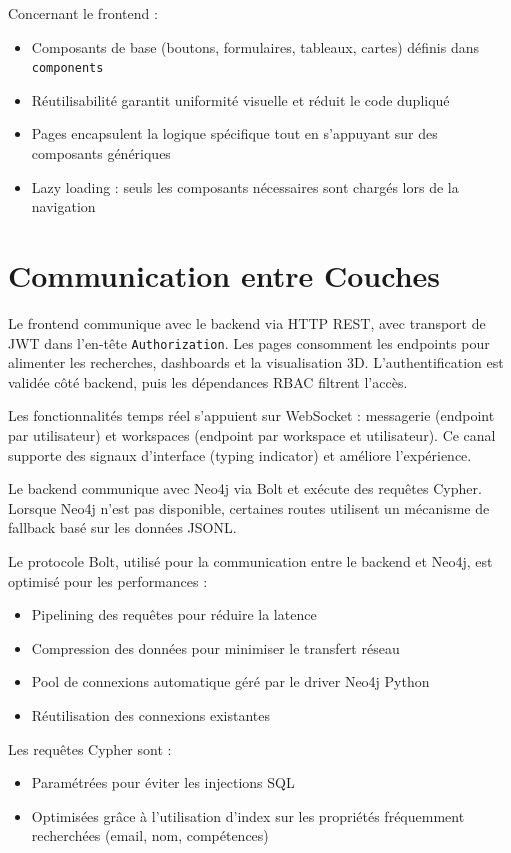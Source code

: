 \documentclass[12pt,a4paper]{report}
\begin{document}
Concernant le frontend :
\begin{itemize}
  \item Composants de base (boutons, formulaires, tableaux, cartes) définis dans \texttt{components}
  \item Réutilisabilité garantit uniformité visuelle et réduit le code dupliqué
  \item Pages encapsulent la logique spécifique tout en s'appuyant sur des composants génériques
  \item Lazy loading : seuls les composants nécessaires sont chargés lors de la navigation
\end{itemize}

\section{Communication entre Couches}
Le frontend communique avec le backend via HTTP REST, avec transport de JWT dans l'en-tête \texttt{Authorization}. Les pages consomment les endpoints pour alimenter les recherches, dashboards et la visualisation 3D. L'authentification est validée côté backend, puis les dépendances RBAC filtrent l'accès.

Les fonctionnalités temps réel s'appuient sur WebSocket : messagerie (endpoint par utilisateur) et workspaces (endpoint par workspace et utilisateur). Ce canal supporte des signaux d'interface (typing indicator) et améliore l'expérience.

Le backend communique avec Neo4j via Bolt et exécute des requêtes Cypher. Lorsque Neo4j n'est pas disponible, certaines routes utilisent un mécanisme de fallback basé sur les données JSONL.

Le protocole Bolt, utilisé pour la communication entre le backend et Neo4j, est optimisé pour les performances :
\begin{itemize}
  \item Pipelining des requêtes pour réduire la latence
  \item Compression des données pour minimiser le transfert réseau
  \item Pool de connexions automatique géré par le driver Neo4j Python
  \item Réutilisation des connexions existantes
\end{itemize}

Les requêtes Cypher sont :
\begin{itemize}
  \item Paramétrées pour éviter les injections SQL
  \item Optimisées grâce à l'utilisation d'index sur les propriétés fréquemment recherchées (email, nom, compétences)
\end{itemize}
\end{document}
